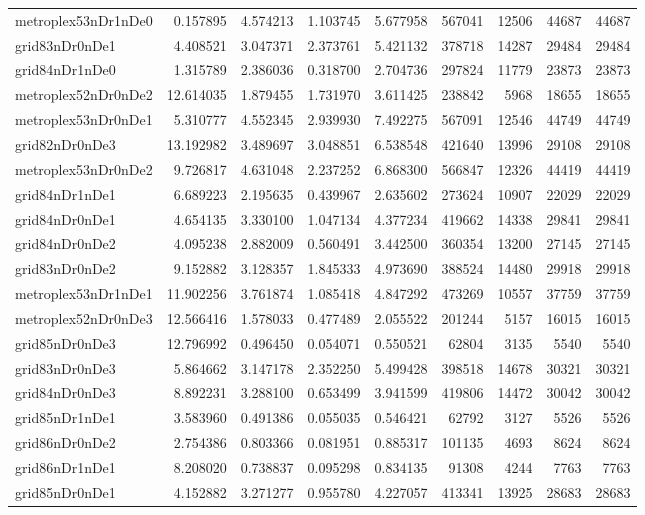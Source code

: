 \documentclass[../../../thesis.tex]{subfiles}
\begin{document}
\begin{longtable}{|l|r|r|r|r|r|r|r|r|}
metroplex53nDr1nDe0 & 0.157895 & 4.574213 & 1.103745 & 5.677958 & 567041 & 12506 & 44687 & 44687 \\
grid83nDr0nDe1 & 4.408521 & 3.047371 & 2.373761 & 5.421132 & 378718 & 14287 & 29484 & 29484 \\
grid84nDr1nDe0 & 1.315789 & 2.386036 & 0.318700 & 2.704736 & 297824 & 11779 & 23873 & 23873 \\
metroplex52nDr0nDe2 & 12.614035 & 1.879455 & 1.731970 & 3.611425 & 238842 & 5968 & 18655 & 18655 \\
metroplex53nDr0nDe1 & 5.310777 & 4.552345 & 2.939930 & 7.492275 & 567091 & 12546 & 44749 & 44749 \\
grid82nDr0nDe3 & 13.192982 & 3.489697 & 3.048851 & 6.538548 & 421640 & 13996 & 29108 & 29108 \\
metroplex53nDr0nDe2 & 9.726817 & 4.631048 & 2.237252 & 6.868300 & 566847 & 12326 & 44419 & 44419 \\
grid84nDr1nDe1 & 6.689223 & 2.195635 & 0.439967 & 2.635602 & 273624 & 10907 & 22029 & 22029 \\
grid84nDr0nDe1 & 4.654135 & 3.330100 & 1.047134 & 4.377234 & 419662 & 14338 & 29841 & 29841 \\
grid84nDr0nDe2 & 4.095238 & 2.882009 & 0.560491 & 3.442500 & 360354 & 13200 & 27145 & 27145 \\
grid83nDr0nDe2 & 9.152882 & 3.128357 & 1.845333 & 4.973690 & 388524 & 14480 & 29918 & 29918 \\
metroplex53nDr1nDe1 & 11.902256 & 3.761874 & 1.085418 & 4.847292 & 473269 & 10557 & 37759 & 37759 \\
metroplex52nDr0nDe3 & 12.566416 & 1.578033 & 0.477489 & 2.055522 & 201244 & 5157 & 16015 & 16015 \\
grid85nDr0nDe3 & 12.796992 & 0.496450 & 0.054071 & 0.550521 & 62804 & 3135 & 5540 & 5540 \\
grid83nDr0nDe3 & 5.864662 & 3.147178 & 2.352250 & 5.499428 & 398518 & 14678 & 30321 & 30321 \\
grid84nDr0nDe3 & 8.892231 & 3.288100 & 0.653499 & 3.941599 & 419806 & 14472 & 30042 & 30042 \\
grid85nDr1nDe1 & 3.583960 & 0.491386 & 0.055035 & 0.546421 & 62792 & 3127 & 5526 & 5526 \\
grid86nDr0nDe2 & 2.754386 & 0.803366 & 0.081951 & 0.885317 & 101135 & 4693 & 8624 & 8624 \\
grid86nDr1nDe1 & 8.208020 & 0.738837 & 0.095298 & 0.834135 & 91308 & 4244 & 7763 & 7763 \\
grid85nDr0nDe1 & 4.152882 & 3.271277 & 0.955780 & 4.227057 & 413341 & 13925 & 28683 & 28683 \\

\end{longtable}
\end{document}
